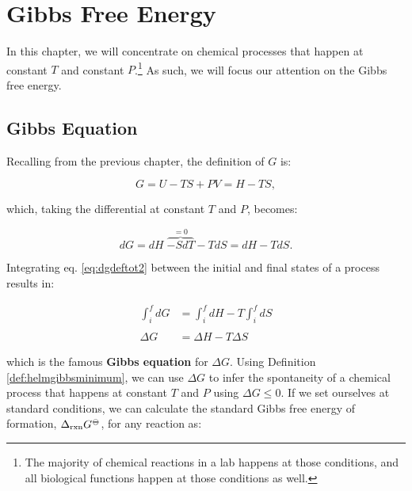 \documentclass[
  9pt,
]{extbook}
\theoremstyle{definition}
\theoremstyle{definition}
\theoremstyle{definition}
\theoremstyle{remark}
\begin{document}
\renewcommand*{\standardstate}{{-\kern-6pt{\ominus}\kern-6pt-}}

\hypertarget{GibbsFree}{%
\chapter{Gibbs Free Energy}\label{GibbsFree}}

In this chapter, we will concentrate on chemical processes that happen at constant \(T\) and constant \(P\).\footnote{The majority of chemical reactions in a lab happens at those conditions, and all biological functions happen at those conditions as well.} As such, we will focus our attention on the Gibbs free energy.

\hypertarget{gibbseqsec}{%
\section{Gibbs Equation}\label{gibbseqsec}}

Recalling from the previous chapter, the definition of \(G\) is:

\begin{equation}
G = U -TS +PV = H-TS,
\label{eq:dgdeftot}
\end{equation}

which, taking the differential at constant \(T\) and \(P\), becomes:

\begin{equation}
dG = dH \; \overbrace{-SdT}^{=0} -TdS = dH -TdS.
\label{eq:dgdeftot2}
\end{equation}

Integrating eq. \eqref{eq:dgdeftot2} between the initial and final states of a process results in:

\begin{equation}
\begin{aligned}
\int_i^f dG &= \int_i^f dH -T \int_i^f dS \\
\\
\Delta G &= \Delta H -T \Delta S
\end{aligned}
\label{eq:gibbseq}
\end{equation}

which is the famous \textbf{Gibbs equation} for \(\Delta G\). Using Definition \ref{def:helmgibbsminimum}, we can use \(\Delta G\) to infer the spontaneity of a chemical process that happens at constant \(T\) and \(P\) using \(\Delta G \leq 0\). If we set ourselves at standard conditions, we can calculate the standard Gibbs free energy of formation, \(\Delta_{\text{rxn}} G^{-\kern-6pt{\ominus}\kern-6pt-}\), for any reaction as:
\end{document}
